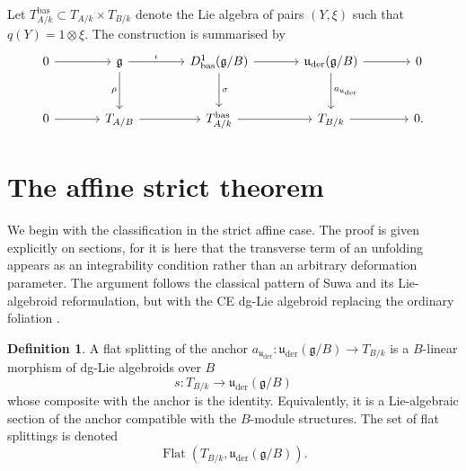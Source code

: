 \documentclass[11pt,reqno,a4paper,dvipsnames,x11names]{amsart}
\numberwithin{equation}{section}
\theoremstyle{plain}
\theoremstyle{definition}
\newtheorem{definition}[theorem]{Definition}
\theoremstyle{remark}
\DeclareMathOperator{\Flat}{Flat}
\newcommand{\kk}{k}
\newcommand{\g}{\mathfrak g}
\newcommand{\uuder}{\mathfrak u_{\mathrm{der}}}
\newcommand{\bas}{\mathrm{bas}}
\newcommand{\from}{\colon}
\begin{document}
Let \(T^{\bas}_{A/\kk}\subset T_{A/\kk}\times T_{B/\kk}\) denote the Lie algebra of pairs \((Y,\xi)\) such that \(q(Y)=1\otimes\xi\). The construction is summarised by
\[
\begin{tikzcd}[column sep=large,row sep=large]
0 \arrow[r] & \g \arrow[r,"\iota"] \arrow[d,"\rho"'] & D^1_{\bas}(\g/B) \arrow[r] \arrow[d,"\sigma"] & \uuder(\g/B) \arrow[r] \arrow[d,"a_{\uuder}"] & 0 \\
0 \arrow[r] & T_{A/B} \arrow[r] & T^{\bas}_{A/\kk} \arrow[r] & T_{B/\kk} \arrow[r] & 0 .
\end{tikzcd}
\]

\section{The affine strict theorem}

We begin with the classification in the strict affine case. The proof is given explicitly on sections, for it is here that the transverse term of an unfolding appears as an integrability condition rather than an arbitrary deformation parameter. The argument follows the classical pattern of Suwa and its Lie-algebroid reformulation, but with the CE dg-Lie algebroid replacing the ordinary foliation \cite{Suwa81,Suwa83,Quallbrunn,CMQ}.

\begin{definition}
A flat splitting of the anchor
$
 a_{\uuder}\from \uuder(\g/B)\longrightarrow T_{B/\kk}
$
is a \(B\)-linear morphism of dg-Lie algebroids over \(B\)
\[
 s\from T_{B/\kk}\longrightarrow \uuder(\g/B)
\]
whose composite with the anchor is the identity. Equivalently, it is a Lie-algebraic section of the anchor compatible with the \(B\)-module structures. The set of flat splittings is denoted
\[
 \Flat(T_{B/\kk},\uuder(\g/B)).
\]
\end{definition}
\end{document}
